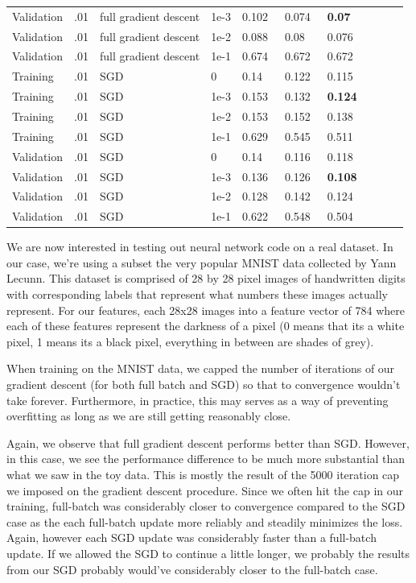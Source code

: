 \documentclass[10pt]{article}
\begin{document}
\begin{table}
\begin{tabular}{llllllllll}
Validation & .01 & full gradient descent & 1e-3 & 0.102 & 0.074 & \bf{0.07}  \\
Validation & .01 & full gradient descent & 1e-2 & 0.088 & 0.08  & 0.076 \\
Validation & .01 & full gradient descent & 1e-1 & 0.674 & 0.672 & 0.672 \\
\midrule
Training &.01 & SGD &  0 & 0.14  & 0.122 & 0.115 \\
Training &.01 & SGD & 1e-3 & 0.153 & 0.132 & \bf{0.124} \\
Training &.01 & SGD & 1e-2 & 0.153 & 0.152 & 0.138 \\
Training &.01 & SGD & 1e-1 & 0.629 & 0.545 & 0.511 \\
\midrule
Validation & .01 & SGD &  0 & 0.14  & 0.116 & 0.118 \\
Validation & .01 & SGD & 1e-3 & 0.136 & 0.126 & \bf{0.108} \\
Validation & .01 & SGD & 1e-2 & 0.128 & 0.142 & 0.124 \\
Validation & .01 & SGD & 1e-1 & 0.622 & 0.548 & 0.504 \\
\bottomrule
\end{tabular}
\end{table}

We are now interested in testing out neural network code on a real dataset. In our case, we're using a subset the very popular MNIST data collected by Yann Lecunn. This dataset is comprised of 28 by 28 pixel images of handwritten digits with corresponding labels that represent what numbers these images actually represent. For our features, each 28x28 images into a feature vector of 784 where each of these features represent the darkness of a pixel (0 means that its a white pixel, 1 means its a black pixel, everything in between are shades of grey).

When training on the MNIST data, we capped the number of iterations of our gradient descent (for both full batch and SGD) so that to convergence wouldn't take forever. Furthermore, in practice, this may serves as a way of preventing overfitting as long as we are still getting reasonably close. 

Again, we observe that full gradient descent performs better than SGD. However, in this case, we see the performance difference to be much more substantial than what we saw in the toy data. This is mostly the result of the 5000 iteration cap we imposed on the gradient descent procedure. Since we often hit the cap in our training, full-batch was considerably closer to convergence compared to the SGD case as the each full-batch update more reliably and steadily minimizes the loss. Again, however each SGD update was considerably faster than a full-batch update. If we allowed the SGD to continue a little longer, we probably the results from our SGD probably would've considerably closer to the full-batch case. 
	
\end{document}
